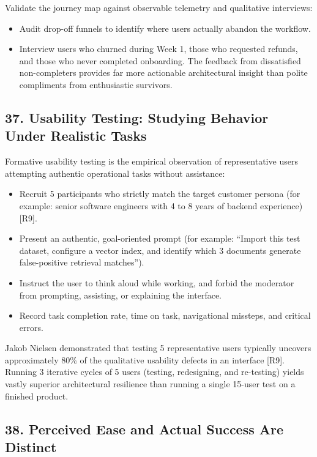 Validate the journey map against observable telemetry and qualitative interviews:
\begin{itemize}
    \item Audit drop-off funnels to identify where users actually abandon the workflow.
    \item Interview users who churned during Week 1, those who requested refunds, and those who never completed onboarding. The feedback from dissatisfied non-completers provides far more actionable architectural insight than polite compliments from enthusiastic survivors.
\end{itemize}

\subsection*{37. Usability Testing: Studying Behavior Under Realistic Tasks}

Formative usability testing is the empirical observation of representative users attempting authentic operational tasks without assistance:
\begin{itemize}
    \item Recruit 5 participants who strictly match the target customer persona (for example: senior software engineers with 4 to 8 years of backend experience) [R9].
    \item Present an authentic, goal-oriented prompt (for example: ``Import this test dataset, configure a vector index, and identify which 3 documents generate false-positive retrieval matches'').
    \item Instruct the user to think aloud while working, and forbid the moderator from prompting, assisting, or explaining the interface.
    \item Record task completion rate, time on task, navigational missteps, and critical errors.
\end{itemize}

Jakob Nielsen demonstrated that testing 5 representative users typically uncovers approximately 80\% of the qualitative usability defects in an interface [R9]. Running 3 iterative cycles of 5 users (testing, redesigning, and re-testing) yields vastly superior architectural resilience than running a single 15-user test on a finished product.

\subsection*{38. Perceived Ease and Actual Success Are Distinct}

